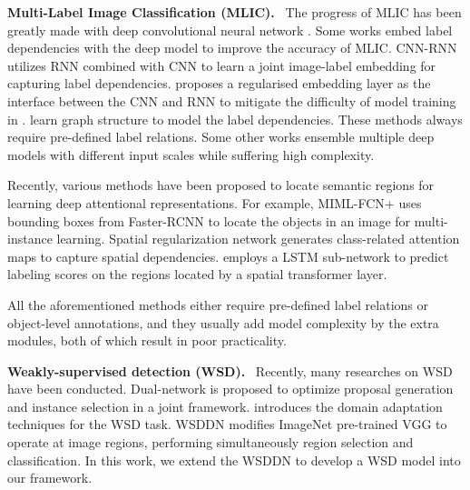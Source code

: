 \documentclass[sigconf,natbib=false]{acmart}
\begin{document}
\noindent \textbf{Multi-Label Image Classification (MLIC).} \ The progress of MLIC \cite{MLIC4_iclr14_YYTAS,MLIC10_pami16_ywjbjys,MLIC20_pr17_PXZXW,MLIC5_cvpr17_FHWNX} has been greatly made with deep convolutional neural network \cite{AlexNet_nips2012_aig,VGG_iclr15_ka,ResNet_cvpr16_hzrs}.  Some works \cite{MLIC1_iccv15_JLL,MLIC2_cvpr17_YYJ,MLIC3_cvpr17_FTTWC,MLIC6_cvpr16_JYJZCW,MLIC8_cvpr16_QMWD,MLIC9_cvpr15_MQACJ,MLIC13_aaai17_CWWYF,MLIC14_eccv16_hjj,MLIC16_iccv17_PRLE,MLIC21_arxiv17_JQJCJ,MLIC24_cvpr16_hgzzg}  embed label dependencies with the deep model to improve the accuracy of MLIC. CNN-RNN \cite{MLIC6_cvpr16_JYJZCW} utilizes RNN combined with CNN to learn a joint image-label embedding for capturing label dependencies. \cite{MLIC3_cvpr17_FTTWC} proposes a regularised embedding layer as the interface between the CNN and RNN to mitigate the difficulty of model training in \cite{MLIC6_cvpr16_JYJZCW}. \cite{MLIC8_cvpr16_QMWD,MLIC9_cvpr15_MQACJ,MLIC26_mm17_javpzh} learn graph structure to model the label dependencies. These methods always require pre-defined label relations. Some other works ensemble multiple deep models with different input scales \cite{MLIC17_aaai18_TZGL,MLIC7_iccv17_ZTGRL} while suffering high complexity.

Recently, various methods \cite{MLIC5_cvpr17_FHWNX,MLIC7_iccv17_ZTGRL,MLIC11_cvpr17_hjjy,MLIC12_cvpr16_hjybjj,MLIC17_aaai18_TZGL,MLIC18_aaai18_SYCY,MLIC22_tmm18_jqjcj} have been proposed to locate semantic regions for learning deep attentional representations. For example, MIML-FCN+ \cite{MLIC11_cvpr17_hjjy} uses bounding boxes from Faster-RCNN \cite{Faster-RCNN_nips15_skfj} to locate the objects in an image for multi-instance learning. Spatial regularization network \cite{MLIC5_cvpr17_FHWNX} generates class-related attention maps to capture
spatial dependencies. \cite{MLIC7_iccv17_ZTGRL} employs a LSTM sub-network to predict labeling scores on the regions located by a spatial transformer layer.

All the aforementioned methods either require pre-defined label relations or object-level annotations, and they usually add model complexity by the extra modules, both of which result in poor practicality.


\noindent \textbf{Weakly-supervised detection (WSD).} \ Recently, many researches on WSD \cite{WSD1_mm17_xdfy,WSD2_cvpr16_ha,WSD5_cvpr17_djysm,WSD6_iccv17_ky,WSD7_iccv17_yyqqj} have been conducted. Dual-network \cite{WSD1_mm17_xdfy} is proposed to optimize proposal generation and instance selection in a joint framework. \cite{WSD5_cvpr17_djysm} introduces the domain adaptation techniques for the WSD task.
WSDDN \cite{WSD2_cvpr16_ha} modifies ImageNet pre-trained VGG \cite{VGG_iclr15_ka} to operate at image regions, performing simultaneously region selection and classification. In this work, we extend the WSDDN to develop a WSD model into our framework.
\end{document}
